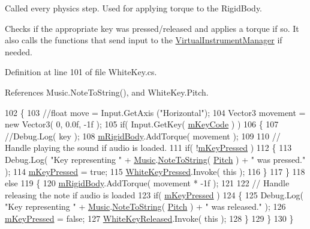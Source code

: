 Called every physics step. Used for applying torque to the Rigid\+Body. 

Checks if the appropriate key was pressed/released and applies a torque if so. It also calls the functions that send input to the \hyperlink{class_virtual_instrument_manager}{Virtual\+Instrument\+Manager} if needed. 

Definition at line 101 of file White\+Key.\+cs.



References Music.\+Note\+To\+String(), and White\+Key.\+Pitch.


\begin{DoxyCode}
102     \{
103         \textcolor{comment}{//float move = Input.GetAxis ("Horizontal");}
104         Vector3 movement = \textcolor{keyword}{new} Vector3( 0, 0.0f, -1f );
105         \textcolor{keywordflow}{if}( Input.GetKey( \hyperlink{group___white_key_priv_var_gaeb8c5eafd138c45894858554f739eaf7}{mKeyCode} ) )
106         \{
107             \textcolor{comment}{//Debug.Log( key );}
108             \hyperlink{group___white_key_priv_var_gadc6bd637ef5229f7519b213f038ca15d}{mRigidBody}.AddTorque( movement );
109 
110             \textcolor{comment}{// Handle playing the sound if audio is loaded.}
111             \textcolor{keywordflow}{if}( !\hyperlink{group___white_key_priv_var_gae2501ace0af5e1313147504bf61bf3e9}{mKeyPressed} )
112             \{
113                 Debug.Log( \textcolor{stringliteral}{"Key representing "} + \hyperlink{class_music}{Music}.\hyperlink{group___music_stat_func_ga85a22c905d56d4c5f4e62159bfecee8c}{NoteToString}( 
      \hyperlink{group___white_key_pub_var_ga1ddd98b85ba069defc7cf47d25f625f4}{Pitch} ) + \textcolor{stringliteral}{" was pressed."} );
114                 \hyperlink{group___white_key_priv_var_gae2501ace0af5e1313147504bf61bf3e9}{mKeyPressed} = \textcolor{keyword}{true};
115                 \hyperlink{group___white_key_events_gab84691fc1e9f7b62884589d1813433e2}{WhiteKeyPressed}.Invoke( \textcolor{keyword}{this} );
116             \}
117         \}
118         \textcolor{keywordflow}{else}
119         \{
120             \hyperlink{group___white_key_priv_var_gadc6bd637ef5229f7519b213f038ca15d}{mRigidBody}.AddTorque( movement * -1f );
121 
122             \textcolor{comment}{// Handle releasing the note if audio is loaded}
123             \textcolor{keywordflow}{if}( \hyperlink{group___white_key_priv_var_gae2501ace0af5e1313147504bf61bf3e9}{mKeyPressed} )
124             \{
125                 Debug.Log( \textcolor{stringliteral}{"Key representing "} + \hyperlink{class_music}{Music}.\hyperlink{group___music_stat_func_ga85a22c905d56d4c5f4e62159bfecee8c}{NoteToString}( 
      \hyperlink{group___white_key_pub_var_ga1ddd98b85ba069defc7cf47d25f625f4}{Pitch} ) + \textcolor{stringliteral}{" was released."} );
126                 \hyperlink{group___white_key_priv_var_gae2501ace0af5e1313147504bf61bf3e9}{mKeyPressed} = \textcolor{keyword}{false};
127                 \hyperlink{group___white_key_events_ga180e88cd7ab95af43231f53469e87830}{WhiteKeyReleased}.Invoke( \textcolor{keyword}{this} );
128             \}
129         \}
130     \}
\end{DoxyCode}
